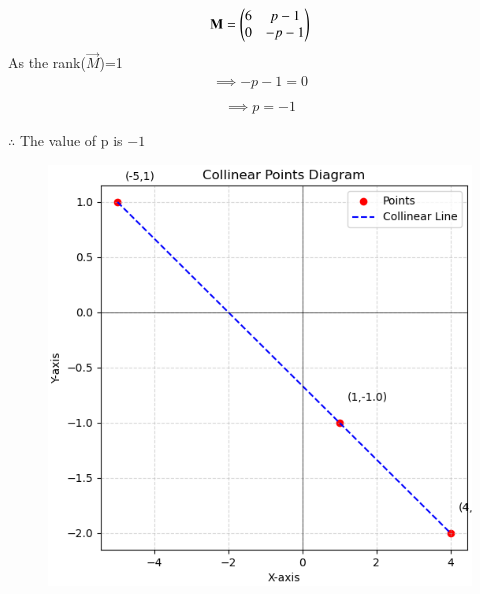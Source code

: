 \documentclass[journal,12pt,onecolumn]{IEEEtran}
\begin{document}
\begin{align}
    \mathbf{M}=\begin{pmatrix}6 & p-1\\0 & -p-1\end{pmatrix}
\end{align}
As the rank($\vec{M}$)=1\\
\begin{align}
    \implies -p-1=0\\
\end{align}
\begin{align}
  \implies  \boxed{p=-1}
\end{align}
\begin{center}
$\therefore$ The value of p is $-1$
\end{center}
\begin{figure}[H]
 \centering
	\includegraphics[width=0.7\linewidth]{figs/fig1.png}
	\caption{}
	\label{fig}
\end{figure}
\end{document}
